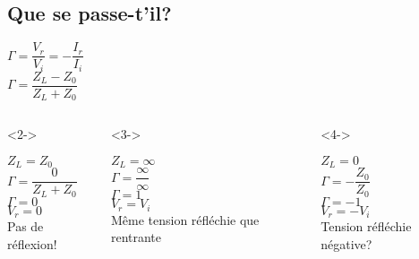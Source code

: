 \subsection{Que se passe-t'il?}
\begin{frame}
    \begin{center}
        $\Gamma = \dfrac{V_r}{V_i} = -\dfrac{I_r}{I_i}$\\
        $\Gamma = \dfrac{Z_L - Z_0}{Z_L + Z_0}$\\
    \end{center}
    \vspace{5mm}
    \begin{columns}
        \begin{column}{0.33\textwidth}<2->
            \begin{center}
                $Z_L = Z_0$\\
                $\Gamma = \dfrac{0}{Z_L + Z_0}$\\
                $\Gamma = 0$\\
                $V_r = 0$\\
                Pas de réflexion!
            \end{center}
        \end{column}
        \begin{column}{0.33\textwidth}<3->
            \begin{center}
                $Z_L = \infty$\\
                $\Gamma = \dfrac{\infty}{\infty}$\\
                $\Gamma = 1$\\
                $V_r = V_i$\\
                Même tension réfléchie que rentrante
            \end{center}
        \end{column}
        \begin{column}{0.33\textwidth}<4->
            \begin{center}
                $Z_L = 0$\\
                $\Gamma = -\dfrac{Z_0}{Z_0}$\\
                $\Gamma = -1$\\
                $V_r = -V_i$\\
                Tension réfléchie négative?
            \end{center}
        \end{column}
    \end{columns}
\end{frame}



